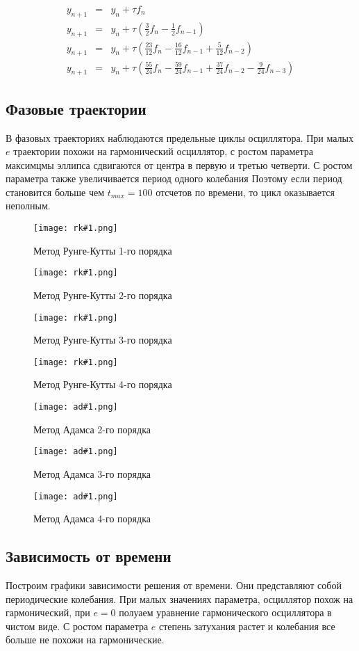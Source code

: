 \documentclass[a4paper,12pt]{article} %
\begin{document}
\begin{eqnarray*}
	y_{n+1} & = & y_n + \tau f_n\\
	y_{n+1} & = & y_n + \tau (\frac{3}{2}f_n - \frac{1}{2}f_{n-1})\\
	y_{n+1} & = & y_n + \tau (\frac{23}{12}f_n - \frac{16}{12}f_{n-1} + \frac{5}{12}f_{n-2})\\
	y_{n+1} & = & y_n + \tau (\frac{55}{24}f_n - \frac{59}{24}f_{n-1} + \frac{37}{24}f_{n-2} - \frac{9}{24}f_{n-3})
\end{eqnarray*}

\subsection*{Фазовые траектории}

В фазовых траекториях наблюдаются предельные циклы осциллятора. При малых $e$ траектории похожи на гармонический осциллятор, с ростом параметра максимцмы эллипса сдвигаются от центра в первую и третью четверти. С ростом параметра также увеличивается период одного колебания Поэтому если период становится больше чем $t_{max} = 100$ отсчетов по времени, то цикл оказывается неполным.

\newcommand{\kuttaGraph}[1]{
\begin{figure}[H]
	\centering
	\texttt{[image: rk\#1.png]}
	\caption{Метод Рунге-Кутты #1-го порядка}
\end{figure}}

\kuttaGraph{1}

\kuttaGraph{2}

\kuttaGraph{3}

\kuttaGraph{4}

\newcommand{\adamsGraph}[1]{
\begin{figure}[H]
	\centering
	\texttt{[image: ad\#1.png]}
	\caption{Метод Адамса #1-го порядка}
\end{figure}}

\adamsGraph{2}

\adamsGraph{3}

\adamsGraph{4}

\subsection*{Зависимость от времени}

Построим графики зависимости решения от времени. Они представляют собой периодические колебания. При малых значениях параметра, осциллятор похож на гармонический, при $e=0$ полуаем уравнение гармонического осциллятора в чистом виде. С ростом параметра $e$   степень затухания растет и колебания все больше не похожи на гармонические.
\end{document}
